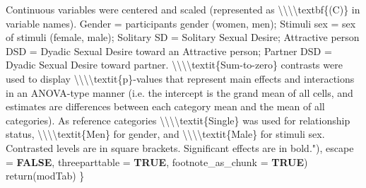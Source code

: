 \documentclass[
  bookmarksnumbered]{article}
\newenvironment{Shaded}{\begin{snugshade}}{\end{snugshade}}
\newcommand{\AttributeTok}[1]{\textcolor[rgb]{0.80,0.80,0.80}{#1}}
\newcommand{\ConstantTok}[1]{\textcolor[rgb]{0.86,0.64,0.64}{\textbf{#1}}}
\newcommand{\FunctionTok}[1]{\textcolor[rgb]{0.94,0.94,0.56}{#1}}
\newcommand{\NormalTok}[1]{\textcolor[rgb]{0.80,0.80,0.80}{#1}}
\newcommand{\SpecialCharTok}[1]{\textcolor[rgb]{0.86,0.64,0.64}{#1}}
\newcommand{\StringTok}[1]{\textcolor[rgb]{0.80,0.58,0.58}{#1}}
\begin{document}
\begin{Shaded}
\begin{Highlighting}[]
\StringTok{                              Continuous variables were centered and scaled}
\StringTok{                              (represented as }\SpecialCharTok{\textbackslash{}\textbackslash{}\textbackslash{}\textbackslash{}}\StringTok{textbf\{(C)\} in variable names).}
\StringTok{                              Gender = participants gender (women, men); }
\StringTok{                              Stimuli sex = sex of stimuli (female, male); }
\StringTok{                              Solitary SD = Solitary Sexual Desire;}
\StringTok{                              Attractive person DSD = Dyadic Sexual Desire toward an }
\StringTok{                              Attractive person;}
\StringTok{                              Partner DSD = Dyadic Sexual Desire toward partner.}
\StringTok{                              }\SpecialCharTok{\textbackslash{}\textbackslash{}\textbackslash{}\textbackslash{}}\StringTok{textit\{Sum{-}to{-}zero\} contrasts were used to display}
\StringTok{                              }\SpecialCharTok{\textbackslash{}\textbackslash{}\textbackslash{}\textbackslash{}}\StringTok{textit\{p\}{-}values that represent main effects and interactions }
\StringTok{                              in an ANOVA{-}type manner (i.e. the intercept is the grand mean of }
\StringTok{                              all cells, and estimates are differences between each category}
\StringTok{                              mean and the mean of all categories).}
\StringTok{                              As reference categories }
\StringTok{                              }\SpecialCharTok{\textbackslash{}\textbackslash{}\textbackslash{}\textbackslash{}}\StringTok{textit\{Single\} was used for relationship status,}
\StringTok{                              }\SpecialCharTok{\textbackslash{}\textbackslash{}\textbackslash{}\textbackslash{}}\StringTok{textit\{Men\} for gender,}
\StringTok{                              and }\SpecialCharTok{\textbackslash{}\textbackslash{}\textbackslash{}\textbackslash{}}\StringTok{textit\{Male\} for stimuli sex. }
\StringTok{                              Contrasted levels are in square brackets. }
\StringTok{                              Significant effects are in bold."}\NormalTok{),}
             \AttributeTok{escape =} \ConstantTok{FALSE}\NormalTok{,}
             \AttributeTok{threeparttable =} \ConstantTok{TRUE}\NormalTok{,}
             \AttributeTok{footnote\_as\_chunk =} \ConstantTok{TRUE}\NormalTok{)}
    \FunctionTok{return}\NormalTok{(modTab)}
\NormalTok{\}}
\end{Highlighting}
\end{Shaded}
\end{document}
